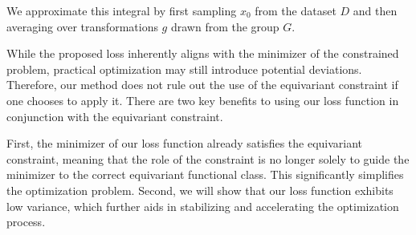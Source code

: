 We approximate this integral by first sampling \(x_0\) from the dataset \(D\) and then averaging over transformations \(g\) drawn from the group \(G\).






While the proposed loss inherently aligns with the minimizer of the constrained problem, practical optimization may still introduce potential deviations. Therefore, our method does not rule out the use of the equivariant constraint if one chooses to apply it. There are two key benefits to using our loss function in conjunction with the equivariant constraint. 

First, the minimizer of our loss function already satisfies the equivariant constraint, meaning that the role of the constraint is no longer solely to guide the minimizer to the correct equivariant functional class. This significantly simplifies the optimization problem. Second, we will show that our loss function exhibits low variance, which further aids in stabilizing and accelerating the optimization process.


